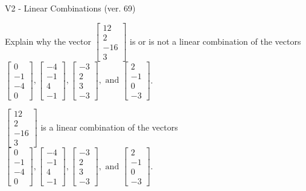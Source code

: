 \begin{exercise}
  \begin{exerciseTitle}V2 - Linear Combinations (ver. 69)\end{exerciseTitle}
  \begin{exerciseStatement}
    Explain why the vector \(\left[\begin{array}{c}
12 \\
2 \\
-16 \\
3
\end{array}\right]\)  is or is not a linear 
	combination of the vectors \(\left[\begin{array}{c}
0 \\
-1 \\
-4 \\
0
\end{array}\right] , \left[\begin{array}{c}
-4 \\
-1 \\
4 \\
-1
\end{array}\right] , \left[\begin{array}{c}
-3 \\
2 \\
3 \\
-3
\end{array}\right] , \text{ and } \left[\begin{array}{c}
2 \\
-1 \\
0 \\
-3
\end{array}\right]\).
	


  \end{exerciseStatement}
  \begin{exerciseAnswer}
   \(\left[\begin{array}{c}
12 \\
2 \\
-16 \\
3
\end{array}\right]\) 
  	 is  
	a linear combination of the vectors \(\left[\begin{array}{c}
0 \\
-1 \\
-4 \\
0
\end{array}\right] , \left[\begin{array}{c}
-4 \\
-1 \\
4 \\
-1
\end{array}\right] , \left[\begin{array}{c}
-3 \\
2 \\
3 \\
-3
\end{array}\right] , \text{ and } \left[\begin{array}{c}
2 \\
-1 \\
0 \\
-3
\end{array}\right]\).


\end{exerciseAnswer}
\end{exercise}
